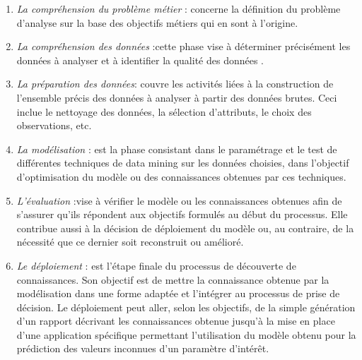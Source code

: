 \begin{enumerate}
	\item \emph{La compréhension du problème métier} :  concerne la définition du problème d'analyse sur la base des objectifs métiers qui en sont à l'origine.
	\item \emph{La compréhension des données} :cette phase vise à déterminer précisément les données à analyser et à identifier la qualité des données .
	\item \emph{La préparation des données}: couvre les activités liées à la construction de l'ensemble précis des données à analyser à partir des données brutes. Ceci inclue le nettoyage des données, la sélection d'attributs, le choix des observations, etc.
	\item \emph{La modélisation }: est la phase consistant dans le paramétrage et le test de différentes techniques de data mining sur les données choisies, dans l'objectif d'optimisation du modèle ou des connaissances obtenues par ces techniques.
	\item \emph{L'évaluation }:vise à vérifier le modèle ou les connaissances obtenues afin de s'assurer qu'ils répondent aux objectifs formulés au début du processus. Elle contribue aussi à la décision de déploiement  du modèle ou, au contraire, de la nécessité que ce dernier soit reconstruit ou amélioré.
	\item \emph{Le déploiement }: est l'étape finale du processus de découverte de connaissances. Son objectif est de mettre la connaissance obtenue par la modélisation dans une forme adaptée et l'intégrer au processus de prise de décision. Le déploiement peut aller, selon les objectifs, de la simple génération d'un rapport décrivant les connaissances obtenue jusqu'à la mise en place d'une application spécifique permettant l'utilisation du modèle obtenu pour la prédiction des valeurs inconnues d'un paramètre d'intérêt.
\end{enumerate}

